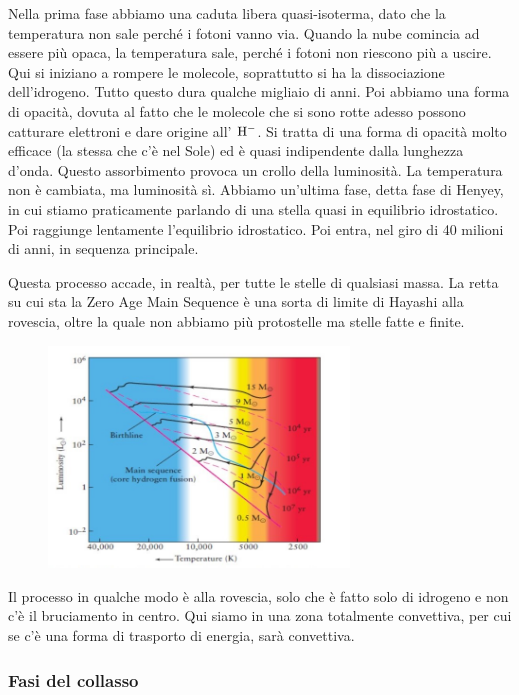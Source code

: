 Nella prima fase abbiamo una caduta libera quasi-isoterma, dato che la temperatura non sale perché i fotoni vanno via. Quando la nube comincia ad essere più opaca, la temperatura sale, perché i fotoni non riescono più a uscire. Qui si iniziano a rompere le molecole, soprattutto si ha la dissociazione dell'idrogeno. Tutto questo dura qualche migliaio di anni. Poi abbiamo una forma di opacità, dovuta al fatto che le molecole che si sono rotte adesso possono catturare elettroni e dare origine all' $\rm H^-$. Si tratta di una forma di opacità molto efficace (la stessa che c'è nel Sole) ed è quasi indipendente dalla lunghezza d'onda. Questo assorbimento provoca un crollo della luminosità. La temperatura non è cambiata, ma luminosità sì. Abbiamo un'ultima fase, detta fase di Henyey, in cui stiamo praticamente parlando di una stella quasi in equilibrio idrostatico. Poi raggiunge lentamente l'equilibrio idrostatico. Poi entra, nel giro di 40 milioni di anni, in sequenza principale.

Questa processo accade, in realtà, per tutte le stelle di qualsiasi massa. La retta su cui sta la Zero Age Main Sequence è una sorta di limite di Hayashi alla rovescia, oltre la quale non abbiamo più protostelle ma stelle fatte e finite.

\begin{figure}[H]
    \centering
    \includegraphics[width=8cm]{lezione 28 novembre/traccepresequenza2.jpg}
    \label{lezione 28 novembre/traccepre-sequenza2.jpg}
\end{figure}

Il processo in qualche modo è alla rovescia, solo che è fatto solo di idrogeno e non c'è il bruciamento in centro. Qui siamo in una zona totalmente convettiva, per cui se c'è una forma di trasporto di energia, sarà convettiva.

\subsubsection{Fasi del collasso}


